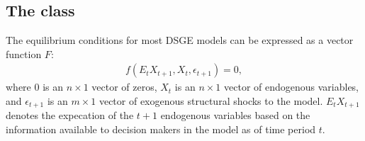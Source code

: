 \documentclass[letterpaper,10pt,openany,oneside,english]{sphinxmanual}
\begin{document}
\subsection{The  class}
\label{\detokenize{howLinearsolveWorks:The-linearsolve.model-class}}
The equilibrium conditions for most DSGE models can be expressed as a vector function \(F\):
\label{\detokenize{howLinearsolveWorks:equation-howLinearsolveWorks:0}}\begin{equation}\label{equation:howLinearsolveWorks:howLinearsolveWorks:0}
\begin{split}f(E_t X_{t+1}, X_t, \epsilon_{t+1}) = 0,\end{split}
\end{equation}
where 0 is an \(n\times 1\) vector of zeros, \(X_t\) is an \(n\times 1\) vector of endogenous variables, and \(\epsilon_{t+1}\) is an \(m\times 1\) vector of exogenous structural shocks to the model. \(E_tX_{t+1}\) denotes the expecation of the \(t+1\) endogenous variables based on the information available to decision makers in the model as of time period \(t\).
\end{document}
